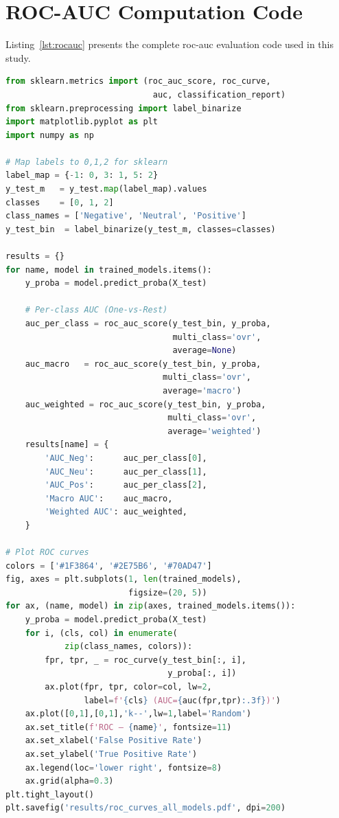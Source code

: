 \chapter{ROC-AUC Computation Code}
\label{app:roc}

Listing~\ref{lst:rocauc} presents the complete \gls{roc}-\gls{auc} evaluation code used in this study.

\begin{lstlisting}[language=Python, caption={Multi-class ROC-AUC evaluation (One-vs-Rest strategy).}, label={lst:rocauc}]
from sklearn.metrics import (roc_auc_score, roc_curve,
                              auc, classification_report)
from sklearn.preprocessing import label_binarize
import matplotlib.pyplot as plt
import numpy as np

# Map labels to 0,1,2 for sklearn
label_map = {-1: 0, 3: 1, 5: 2}
y_test_m   = y_test.map(label_map).values
classes    = [0, 1, 2]
class_names = ['Negative', 'Neutral', 'Positive']
y_test_bin  = label_binarize(y_test_m, classes=classes)

results = {}
for name, model in trained_models.items():
    y_proba = model.predict_proba(X_test)

    # Per-class AUC (One-vs-Rest)
    auc_per_class = roc_auc_score(y_test_bin, y_proba,
                                  multi_class='ovr',
                                  average=None)
    auc_macro   = roc_auc_score(y_test_bin, y_proba,
                                multi_class='ovr',
                                average='macro')
    auc_weighted = roc_auc_score(y_test_bin, y_proba,
                                 multi_class='ovr',
                                 average='weighted')
    results[name] = {
        'AUC_Neg':      auc_per_class[0],
        'AUC_Neu':      auc_per_class[1],
        'AUC_Pos':      auc_per_class[2],
        'Macro AUC':    auc_macro,
        'Weighted AUC': auc_weighted,
    }

# Plot ROC curves
colors = ['#1F3864', '#2E75B6', '#70AD47']
fig, axes = plt.subplots(1, len(trained_models),
                         figsize=(20, 5))
for ax, (name, model) in zip(axes, trained_models.items()):
    y_proba = model.predict_proba(X_test)
    for i, (cls, col) in enumerate(
            zip(class_names, colors)):
        fpr, tpr, _ = roc_curve(y_test_bin[:, i],
                                 y_proba[:, i])
        ax.plot(fpr, tpr, color=col, lw=2,
                label=f'{cls} (AUC={auc(fpr,tpr):.3f})')
    ax.plot([0,1],[0,1],'k--',lw=1,label='Random')
    ax.set_title(f'ROC — {name}', fontsize=11)
    ax.set_xlabel('False Positive Rate')
    ax.set_ylabel('True Positive Rate')
    ax.legend(loc='lower right', fontsize=8)
    ax.grid(alpha=0.3)
plt.tight_layout()
plt.savefig('results/roc_curves_all_models.pdf', dpi=200)
\end{lstlisting}

